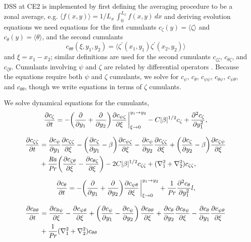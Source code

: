 \documentclass{jfm}
\newcommand{\cz}{c_{\zeta}}
\newcommand{\cs}{c_{\psi}}
\newcommand{\ct}{c_{\theta}}
\newcommand{\css}{c_{\psi \psi}}
\newcommand{\csz}{c_{\psi \zeta}}
\newcommand{\czs}{c_{\zeta \psi}}
\newcommand{\czz}{c_{\zeta \zeta}}
\newcommand{\ctz}{c_{\theta \zeta}}
\newcommand{\czt}{c_{\zeta \theta}}
\newcommand{\ctt}{c_{\theta \theta}}
\newcommand{\cst}{c_{\psi \theta}}
\newcommand{\cts}{c_{\theta \psi}}
\newcommand{\Rayleigh}{\mbox{\textit{Ra}}}  %
\begin{document}
DSS at CE2 is implemented by first defining the averaging procedure to be a zonal average, e.g. $\langle f(x,y) \rangle = 1/L_x \, \int_0^{L_x} f(x,y) \, dx$ and deriving evolution equations we need equations for the first cumulants $\cz(y) = \langle \zeta \rangle $ and $\ct(y) = \langle \theta \rangle$, and the second cumulants 
\begin{equation}
    \ctt(\xi,y_1,y_2) = \langle \zeta^\prime(x_1,y_1) \zeta^\prime(x_2,y_2) \rangle
\end{equation}
and $\xi = x_1 - x_2$; similar definitions are used for the second cumulants $\czz$, $\ctz$, and $\czt$. 
Cumulants involving $\psi$ and $\zeta$ are related by differential operators \citep[see e.g.][]{2013PhRvL.110j4502T}.
Because the equations require both $\psi$ and $\zeta$ cumulants, we solve for $\cs$, $\ct$, $\css$, $\cts$, $\cst$, and $\ctt$, though we write equations in terms of $\zeta$ cumulants.

We solve dynamical equations for the cumulants,
\begin{equation}
  \label{eq:cz}
  \pdv{\cz}{t} = - \qty(\pdv{y_1} + \pdv{y_2}) \pdv{\csz}{\xi}\eval_{\xi \to 0}^{y_1 \to y_2} - C |\beta|^{1/2} \cz + \pdv[2]{\cz}{y_1},
\end{equation}

\begin{equation}
  \label{eq:czz}
  \begin{split}
    \pdv{\czz}{t} &= \pdv{\cs}{y_1} \pdv{\czz}{\xi} - \qty(\pdv{\cz}{y_1} - \beta) \pdv{\csz}{\xi} - \pdv{\cs}{y_2} \pdv{\czz}{\xi}  + \qty(\pdv{\cz}{y_2} - \beta) \pdv{\czs}{\xi}\\
    &+ \frac{\Rayleigh}{\Pran} \qty(\pdv{\czt}{\xi} -  \pdv{\ctz}{\xi}) - 2C |\beta|^{1/2} \czz + (\nabla_1^2 + \nabla_2^2) \czz,    
  \end{split}
\end{equation}

\begin{equation}
  \label{eq:ct}
  \pdv{\ct}{t} = - \qty(\pdv{y_1} + \pdv{y_2}) \pdv{\cst}{\xi} \eval_{\xi \to 0}^{y_1 \to y_2} + \frac{1}{\Pran} \pdv[2]{\ct}{y_1}l,
\end{equation}

\begin{equation}
  \label{eq:ctt}
\begin{split}
  \pdv{\ctt}{t} &= \pdv{\cts}{\xi} - \pdv{\cst}{\xi} + \left(\pdv{\cs}{y_1} - \pdv{\cs}{y_2}\right)\pdv{\ctt}{\xi} + \pdv{\ct}{y_2}\pdv{\cts}{\xi} - \pdv{\ct}{y_1}\pdv{\cst}{\xi}\\
&  + \frac{1}{\Pran}(\nabla_1^2 + \nabla_2^2) \ctt
\end{split}
\end{equation}
\end{document}

